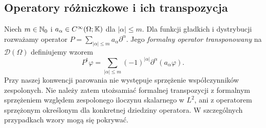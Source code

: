 \subsection{Operatory różniczkowe i ich transpozycja}

\begin{definicja}
\label{def:formal-transpose20}
Niech $m\in\mathbb N_0$ i $a_\alpha\in C^\infty(\Omega;\mathbb K)$
dla $|\alpha|\le m$. Dla funkcji gładkich i dystrybucji
rozważamy operator $P=\sum_{|\alpha|\le m}a_\alpha\partial^\alpha$.
Jego \emph{formalny operator transponowany} na $\mathcal D(\Omega)$
definiujemy wzorem
\[
 P^{\mathrm t}\varphi=
 \sum_{|\alpha|\le m}(-1)^{|\alpha|}
 \partial^\alpha(a_\alpha\varphi).
\]
Przy naszej konwencji parowania nie występuje sprzężenie
współczynników zespolonych. Nie należy zatem utożsamiać
formalnej transpozycji z formalnym sprzężeniem względem
zespolonego iloczynu skalarnego w $L^2$, ani z operatorem
sprzężonym określonym dla konkretnej dziedziny operatora.
W szczególnych przypadkach wzory mogą się pokrywać.
\end{definicja}

